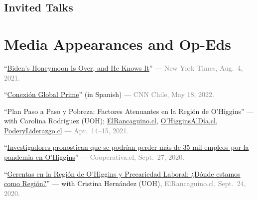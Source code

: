 \documentclass[letterpaper]{article}
\renewenvironment{itemize}{
  \begin{list}{}{
    \setlength{\leftmargin}{1.5em}
  }
}{
  \end{list}
}
\begin{document}
\subsection*{Invited Talks}

{\unskip}


\section*{Media Appearances and Op-Eds}

\begin{itemize}

  \item[\textcolor{gray}{\textbullet}] ``\href{https://www.nytimes.com/2021/08/04/opinion/biden-eviction-covid-democrats.html}{Biden's Honeymoon Is Over, and He Knows It}'' — \textcolor{gray}{New York Times, Aug.\ 4, 2021.}

  \item[\textcolor{gray}{\textbullet}] ``\href{https://x.com/CNNChile/status/1527122195780186112}{Conexi\'on Global Prime}'' (in Spanish) — \textcolor{gray}{CNN Chile, May 18, 2022.}

  \item[\textcolor{gray}{\textbullet}] ``{\color{blue}Plan Paso a Paso y Pobreza: Factores Atenuantes en la Región de O'Higgins}'' — with Carolina Rodriguez (UOH); \href{https://www.elrancaguino.cl/2021/04/14/opinion-plan-paso-a-paso-y-pobreza-factores-atenuantes-en-la-region-de-ohiggins/}{ElRancaguino.cl}, \href{https://ohigginsaldia.cl/2021/04/14/plan-paso-a-paso-y-pobreza-factores-atenuantes-en-la-region-de-ohiggins/amp/?__twitter_impression=true}{O'HigginsAlD\'ia.cl}, \href{https://www.poderyliderazgo.cl/opinion-plan-paso-a-paso-y-pobreza-factores-atenuantes-en-la-region-de-ohiggins/}{PoderyLiderazgo.cl} — \textcolor{gray}{Apr.\ 14–15, 2021.}

  \item[\textcolor{gray}{\textbullet}] ``\href{https://cooperativa.cl/noticias/pais/region-de-ohiggins/investigadores-pronostican-que-se-podrian-perder-mas-de-35-mil-empleos/2020-09-27/110705.html}{Investigadores pronostican que se podr\'ian perder m\'as de 35 mil empleos por la pandemia en O'Higgins}'' — \textcolor{gray}{Cooperativa.cl, Sept.\ 27, 2020.}

  \item[\textcolor{gray}{\textbullet}] ``\href{https://www.elrancaguino.cl/2020/09/24/gerentas-en-la-region-de-ohiggins-y-precariedad-laboral-donde-estamos-como-region/}{Gerentas en la Regi\'on de O'Higgins y Precariedad Laboral: ¿D\'onde estamos como Regi\'on?}'' — with Cristina Hern\'andez (UOH), \textcolor{gray}{ElRancaguino.cl, Sept.\ 24, 2020.}


\end{itemize}
\end{document}
